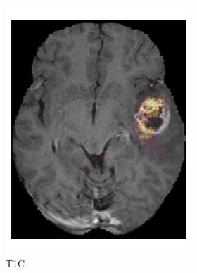 \begin{figure}[htbp]
\begin{subfigure}[b]{\textwidth}
\begin{subfigure}[b]{0.24\textwidth}
        \includegraphics[width=\textwidth]{Figures/saliency_HGG_T1GD.png}
        \caption*{\acrshort{T1C}\nopunct}
        \end{subfigure}
        \hfill
        \begin{subfigure}[b]{0.24\textwidth}

\end{subfigure}
\end{subfigure}
\end{figure}
